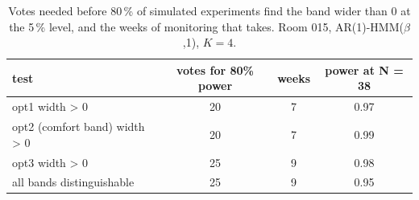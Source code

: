 \begin{table}[ht]
\centering
\begin{tabular}{lccc}
\hline
test & votes for 80\% power & weeks & power at N = 38 \\
\hline
opt1 width > 0 & 20 & 7 & 0.97 \\
opt2 (comfort band) width > 0 & 20 & 7 & 0.99 \\
opt3 width > 0 & 25 & 9 & 0.98 \\
all bands distinguishable & 25 & 9 & 0.95 \\
\hline
\end{tabular}
\caption{Votes needed before 80\,\% of simulated experiments find the band wider than 0 at the 5\,\% level, and the weeks of monitoring that takes. Room 015, AR(1)-HMM($\beta$,1), $K=4$.}
\label{tab:feedback_power_room_015_ar1_hmm_beta_1_K4}
\end{table}
